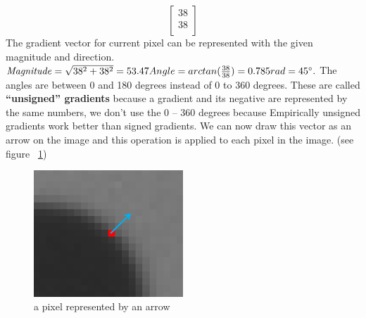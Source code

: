 \[ \begin{bmatrix}
38\\
38\\
\end{bmatrix} \]
The gradient vector for current pixel can be represented with the given magnitude and direction.
\newline \newline
\begin{math}
\mathit{Magnitude} = 
\sqrt{38^2 +  38^2} = 53.47 \newline Angle = arctan(\frac{38}{38}) = 0.785 rad = 45 \degree.
\end{math}
\newline \newline
The angles are between 0 and 180 degrees instead of 0 to 360 degrees. These are called \textbf{“unsigned” gradients} because a gradient and its negative are represented by the same numbers, we don’t use the 0 – 360 degrees because Empirically unsigned gradients work better than signed gradients.
\newline
We can now draw this vector as an arrow on the image and this operation is applied to each pixel in the image. (see figure ~\ref{fig:pixel representation})

\begin{figure}
	\centering
	\includegraphics[width=0.5\textwidth]{images/gray_scale.png}
	\caption{a pixel represented by an arrow}
	\label{fig:pixel representation}
\end{figure}
